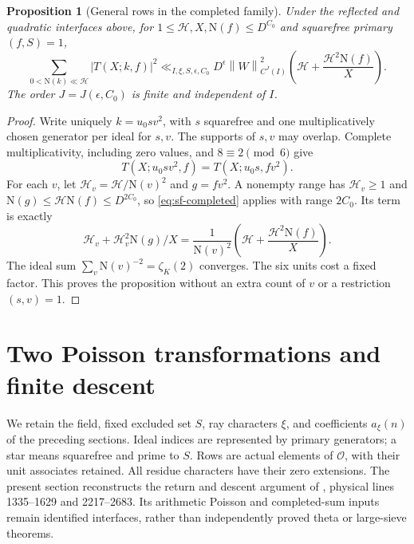 \documentclass[11pt]{article}
\numberwithin{equation}{section}
\newtheorem{proposition}[theorem]{Proposition}
\theoremstyle{definition}
\theoremstyle{remark}
\newcommand{\OO}{\mathcal O}
\newcommand{\N}{\mathrm N}
\newcommand{\norm}[1]{\left\|#1\right\|}
\begin{document}
\begin{proposition}[General rows in the completed family]\label{prop:completed}
Under the reflected and quadratic interfaces above, for
\(1\le\mathcal H,X,\N(f)\le D^{C_0}\) and squarefree primary
\((f,S)=1\),
\begin{equation}\label{eq:completed-bound}
 \sum_{0<\N(k)\ll\mathcal H}|T(X;k,f)|^2
 \ll_{I,\xi,S,\epsilon,C_0}D^\epsilon\norm{W}_{C^J(I)}^2
                 \left(\mathcal H+\frac{\mathcal H^2\N(f)}X\right).
\end{equation}
The order \(J=J(\epsilon,C_0)\) is finite and independent of \(I\).
\end{proposition}
\begin{proof}
Write uniquely \(k=u_0sv^2\), with \(s\) squarefree and one
multiplicatively chosen generator per ideal for \(s,v\).
The supports of \(s,v\) may overlap. Complete multiplicativity,
including zero values, and \(8\equiv2\pmod6\) give
\[
 T(X;u_0sv^2,f)=T(X;u_0s,fv^2).
\]
For each \(v\), let \(\mathcal H_v=\mathcal H/\N(v)^2\) and
\(g=fv^2\). A nonempty range has \(\mathcal H_v\ge1\) and
\(\N(g)\le\mathcal H\N(f)\le D^{2C_0}\), so
\eqref{eq:sf-completed} applies with range \(2C_0\). Its term is
exactly
\[
 \mathcal H_v+\mathcal H_v^2\N(g)/X
 =\frac1{\N(v)^2}
        \left(\mathcal H+\frac{\mathcal H^2\N(f)}X\right).
\]
The ideal sum \(\sum_v\N(v)^{-2}=\zeta_K(2)\) converges.
The six units cost a fixed factor. This proves the proposition
without an extra count of \(v\) or a restriction \((s,v)=1\).
\end{proof}



\section{Two Poisson transformations and finite descent}
\label{sec:consolidated-transfer}

We retain the field, fixed excluded set $S$, ray characters $\xi$, and
coefficients $a_\xi(n)$ of the preceding sections. Ideal indices are
represented by primary generators; a star means squarefree and prime to
$S$. Rows are actual elements of $\OO$, with their unit associates retained.
All residue characters have their zero extensions. The present section
reconstructs the return and descent argument of \cite{Source}, physical
lines 1335--1629 and 2217--2683. Its arithmetic Poisson and completed-sum
inputs remain identified interfaces, rather than independently proved
theta or large-sieve theorems.
\end{document}
